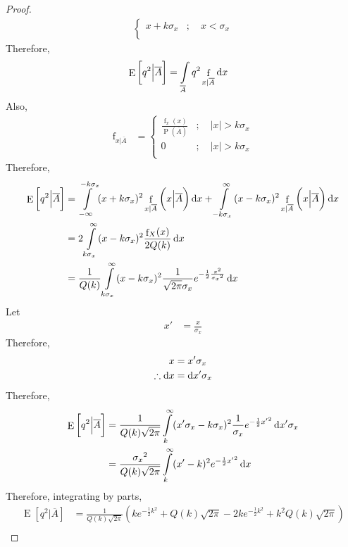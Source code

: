 \documentclass[titlepage, fleqn, a4paper, 12pt, twoside]{article}
\theoremstyle{definition}
\theoremstyle{theorem}
\DeclareMathOperator{\pdf}{\mathrm{f}}
\DeclareMathOperator{\prob}{\mathrm{P}}
\DeclareMathOperator{\expct}{\mathrm{E}}
\begin{document}
\begin{proof}
\begin{align*}
\begin{cases}
				x + k \sigma_x &;\quad x < \sigma_x\\
			\end{cases}
	\end{align*}
	Therefore,
	\begin{align*}
		\expct\left[ q^2 \Big| \overline{A} \right] &= \int\limits_{\overline{A}} q^2 \pdf_{x | \overline{A}} \dif x
	\end{align*}
	Also,
	\begin{align*}
		\pdf_{x | \overline{A}} &=
			\begin{cases}
				\frac{\pdf_x(x)}{\prob\left( \overline{A} \right)} &;\quad |x| > k \sigma_x\\
				0 &;\quad |x| > k \sigma_x\\
			\end{cases}
	\end{align*}
	Therefore,
	\begin{align*}
		\expct\left[ q^2 \Big| \overline{A} \right] &= \int\limits_{-\infty}^{-k \sigma_x} (x + k \sigma_x)^2 \pdf_{x | \overline{A}}\left( x \Big| \overline{A} \right) \dif x + \int\limits_{-k \sigma_x}^{\infty} (x - k \sigma_x)^2 \pdf_{x | \overline{A}}\left( x \Big| \overline{A} \right) \dif x\\
		&= 2 \int\limits_{k \sigma_x}^{\infty} (x - k \sigma_x)^2 \frac{\pdf_X(x)}{2 Q(k)} \dif x\\
		&= \frac{1}{Q(k)} \int\limits_{k \sigma_x}^{\infty} (x - k \sigma_x)^2 \frac{1}{\sqrt{2 \pi} \sigma_x} e^{-\frac{1}{2} \frac{x^2}{{\sigma_x}^2}} \dif x
	\end{align*}
	Let
	\begin{align*}
		x' &= \frac{x}{\sigma_x}
	\end{align*}
	Therefore,
	\begin{align*}
		x &= x' \sigma_x\\
		\therefore \dif x &= \dif x' \sigma_x
	\end{align*}
	Therefore,
	\begin{align*}
		\expct\left[ q^2 \Big| \overline{A} \right] &= \frac{1}{Q(k) \sqrt{2 \pi}} \int\limits_{k}^{\infty} (x' \sigma_x - k \sigma_x)^2 \frac{1}{\sigma_x} e^{-\frac{1}{2} {x'}^2} \dif x' \sigma_x\\
		&= \frac{{\sigma_x}^2}{Q(k) \sqrt{2 \pi}} \int\limits_{k}^{\infty} (x' - k)^2 e^{-\frac{1}{2} {x'}^2} \dif x
	\end{align*}
	Therefore, integrating by parts,
	\begin{align*}
		\expct\left[ q^2 \Big| \overline{A} \right] &= \frac{1}{Q(k) \sqrt{2 \pi}} \left( k e^{-\frac{1}{2} k^2} + Q(k) \sqrt{2 \pi} - 2 k e^{-\frac{1}{2} k^2} + k^2 Q(k) \sqrt{2 \pi} \right)\\

\end{align*}
\end{proof}
\end{document}
